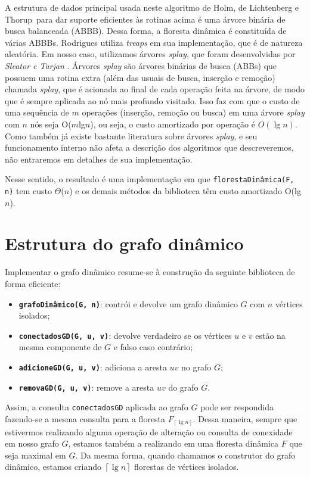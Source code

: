 A estrutura de dados principal usada neste algoritmo de Holm, de Lichtenberg e Thorup~para dar suporte eficientes às rotinas acima é uma árvore binária de busca balanceada (ABBB). Dessa forma, a floresta dinâmica é constituída de várias ABBBs. Rodrigues utiliza \textit{treaps} em sua implementação, que é de natureza aleatória. Em nosso caso, utilizamos árvores \textit{splay}, que foram desenvolvidas por \textit{Sleator e Tarjan} \cite{sleator}. Árvores \textit{splay} são árvores binárias de busca (ABBs) que possuem uma rotina extra (além das usuais de busca, inserção e remoção) chamada \textit{splay}, que é acionada ao final de cada operação feita na árvore, de modo que é sempre aplicada ao nó mais profundo visitado. Isso faz com que o custo de uma sequência de $m$ operações (inserção, remoção ou busca) em uma árvore \textit{splay} com $n$ nós seja O($m$lg$n$), ou seja, o custo amortizado por operação é $O(\lg n)$. Como também já existe bastante literatura sobre árvores \textit{splay}, e seu funcionamento interno não afeta a descrição dos algoritmos que descreveremos, não entraremos em detalhes de sua implementação.

Nesse sentido, o resultado é uma implementação em que \texttt{florestaDinâmica(F, n)} tem custo $\Theta$($n$) e os demais métodos da biblioteca têm custo amortizado O(lg$n$).

\section{Estrutura do grafo dinâmico}
\label{sec:dynamic-graph-structure}

Implementar o grafo dinâmico resume-se à construção da seguinte biblioteca de forma eficiente:

\begin{itemize}
    \item \texttt{\textbf{grafoDinâmico(G, n)}}: contrói e devolve um grafo dinâmico $G$ com $n$ vértices isolados;
    \item \texttt{\textbf{conectadosGD(G, u, v)}}: devolve verdadeiro se os vértices $u$ e $v$ estão na mesma componente de $G$ e falso caso contrário;
    \item \texttt{\textbf{adicioneGD(G, u, v)}}: adiciona a aresta $uv$ no grafo $G$;
    \item \texttt{\textbf{removaGD(G, u, v)}}: remove a aresta $uv$ do grafo $G$.
\end{itemize} 
 
Assim, a consulta \texttt{conectadosGD} aplicada ao grafo $G$ pode ser respondida fazendo-se a mesma consulta para a floresta $F_{\left\lceil \lg n \right\rceil}$. Dessa maneira, sempre que estivermos realizando alguma operação de alteração ou consulta de conexidade em nosso grafo $G$, estamos também a realizando em uma floresta dinâmica $F$ que seja maximal em $G$. Da mesma forma, quando chamamos o construtor do grafo dinâmico, estamos criando $\left\lceil \lg n \right\rceil$ florestas de vértices isolados.

